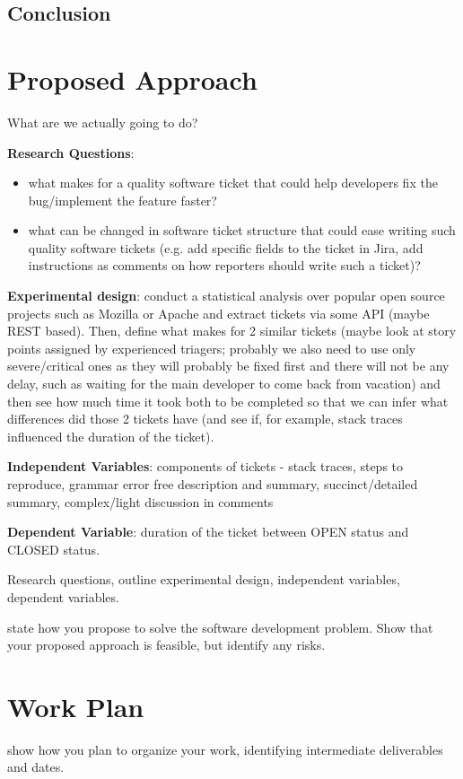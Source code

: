 \documentclass{mprop}
\begin{document}
\subsection{Conclusion}

\section{Proposed Approach}


What are we actually going to do?

\textbf{Research Questions}:
\begin{itemize}
  \item what makes for a quality software ticket that could help developers
    fix the bug/implement the feature faster?
  \item what can be changed in software ticket structure that could ease writing
    such quality software tickets (e.g. add specific fields to the ticket in
    Jira, add instructions as comments on how reporters should write such a 
    ticket)?
  \end{itemize}

\textbf{Experimental design}: conduct a statistical analysis over popular 
open source projects such as Mozilla or Apache and extract tickets via 
some API (maybe REST based). Then, define what makes for 2 similar tickets
(maybe look at story points assigned by experienced triagers; probably we also
need to use only severe/critical ones as they will probably be fixed first
and there will not be any delay, such as waiting for the main developer to come
back from vacation) and then see how much time it took both to be completed
so that we can infer what differences did those 2 tickets have (and see if, for
example, stack traces influenced the duration of the ticket). 

\textbf{Independent Variables}: components of tickets - stack traces, steps
to reproduce, grammar error free description and summary, succinct/detailed 
summary, complex/light discussion in comments

\textbf{Dependent Variable}: duration of the ticket between OPEN status and
CLOSED status.

Research questions, outline experimental design, independent variables, dependent variables.

state how you propose to solve the software development problem. Show that your proposed approach is feasible, but identify any risks.

\section{Work Plan}


show how you plan to organize your work, identifying intermediate deliverables and dates.



\end{document}
